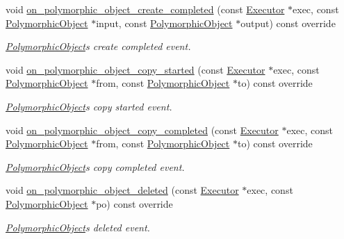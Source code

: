 \begin{DoxyCompactItemize}
void \hyperlink{classgko_1_1log_1_1Record_aca799db6b0a17fcd13c473bf2c9ca821}{on\+\_\+polymorphic\+\_\+object\+\_\+create\+\_\+completed} (const \hyperlink{classgko_1_1Executor}{Executor} $\ast$exec, const \hyperlink{classgko_1_1PolymorphicObject}{Polymorphic\+Object} $\ast$input, const \hyperlink{classgko_1_1PolymorphicObject}{Polymorphic\+Object} $\ast$output) const override
\begin{DoxyCompactList}\small\item\em \hyperlink{classgko_1_1PolymorphicObject}{Polymorphic\+Object}\textquotesingle{}s create completed event. \end{DoxyCompactList}\item 
void \hyperlink{classgko_1_1log_1_1Record_a6e153b45f7919acba75d9eee25e6ee69}{on\+\_\+polymorphic\+\_\+object\+\_\+copy\+\_\+started} (const \hyperlink{classgko_1_1Executor}{Executor} $\ast$exec, const \hyperlink{classgko_1_1PolymorphicObject}{Polymorphic\+Object} $\ast$from, const \hyperlink{classgko_1_1PolymorphicObject}{Polymorphic\+Object} $\ast$to) const override
\begin{DoxyCompactList}\small\item\em \hyperlink{classgko_1_1PolymorphicObject}{Polymorphic\+Object}\textquotesingle{}s copy started event. \end{DoxyCompactList}\item 
void \hyperlink{classgko_1_1log_1_1Record_a55c3f4b9780293f6203de821570d1c91}{on\+\_\+polymorphic\+\_\+object\+\_\+copy\+\_\+completed} (const \hyperlink{classgko_1_1Executor}{Executor} $\ast$exec, const \hyperlink{classgko_1_1PolymorphicObject}{Polymorphic\+Object} $\ast$from, const \hyperlink{classgko_1_1PolymorphicObject}{Polymorphic\+Object} $\ast$to) const override
\begin{DoxyCompactList}\small\item\em \hyperlink{classgko_1_1PolymorphicObject}{Polymorphic\+Object}\textquotesingle{}s copy completed event. \end{DoxyCompactList}\item 
void \hyperlink{classgko_1_1log_1_1Record_a04ad5d1551374ee6c9efdc2adc6a8a01}{on\+\_\+polymorphic\+\_\+object\+\_\+deleted} (const \hyperlink{classgko_1_1Executor}{Executor} $\ast$exec, const \hyperlink{classgko_1_1PolymorphicObject}{Polymorphic\+Object} $\ast$po) const override
\begin{DoxyCompactList}\small\item\em \hyperlink{classgko_1_1PolymorphicObject}{Polymorphic\+Object}\textquotesingle{}s deleted event. \end{DoxyCompactList}\item 

\end{DoxyCompactItemize}
